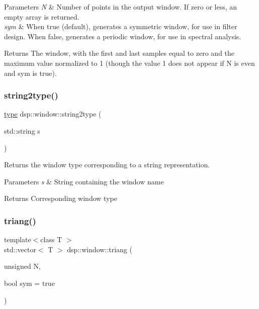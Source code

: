 \begin{DoxyParams}{Parameters}
{\em N} & Number of points in the output window. If zero or less, an empty array is returned. \\
\hline
{\em sym} & When true (default), generates a symmetric window, for use in filter design. When false, generates a periodic window, for use in spectral analysis. \\
\hline
\end{DoxyParams}
\begin{DoxyReturn}{Returns}
The window, with the first and last samples equal to zero and the maximum value normalized to 1 (though the value 1 does not appear if N is even and sym is true). 
\end{DoxyReturn}
\mbox{\label{namespacedsp_1_1window_a34a63560363037f3754daa895c9821bc}} 
\subsubsection{\texorpdfstring{string2type()}{string2type()}}
{\footnotesize\ttfamily \mbox{\hyperlink{namespacedsp_1_1window_a1cc0dcec4aa9e12640771bdf41f695b8}{type}} dsp\+::window\+::string2type (\begin{DoxyParamCaption}\item[{std\+::string}]{s }\end{DoxyParamCaption})\hspace{0.3cm}{\ttfamily [inline]}}



Returns the window type corresponding to a string representation. 


\begin{DoxyParams}{Parameters}
{\em s} & String containing the window name \\
\hline
\end{DoxyParams}
\begin{DoxyReturn}{Returns}
Corresponding window type 
\end{DoxyReturn}
\mbox{\label{namespacedsp_1_1window_a931f388022b655420037a5e1652621d8}} 
\subsubsection{\texorpdfstring{triang()}{triang()}}
{\footnotesize\ttfamily template$<$class T $>$ \\
std\+::vector$<$ T $>$ dsp\+::window\+::triang (\begin{DoxyParamCaption}\item[{unsigned}]{N,  }\item[{bool}]{sym = {\ttfamily true} }\end{DoxyParamCaption})}



